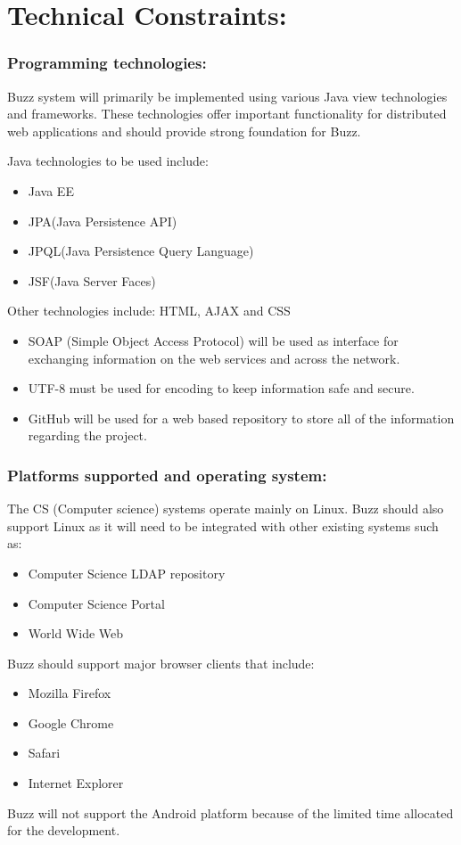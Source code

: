 \documentclass[11pt]{article}
\begin{document}
	\section{Technical Constraints:}
		\subsubsection{	Programming technologies:}
			\textbf{}Buzz system will primarily be implemented using various Java view technologies and frameworks. These technologies offer important functionality for distributed web applications and should provide strong foundation for Buzz.
		
		
	
			\textbf{}Java technologies to be used include:
   	\begin{itemize}		
			\item Java EE
			\item JPA(Java Persistence API)
			\item JPQL(Java  Persistence Query Language)
	 		\item JSF(Java Server Faces)
	\end{itemize}
		\textbf{} Other technologies include: HTML, AJAX and CSS
			\begin{itemize}		
			
		\item 	SOAP (Simple Object Access Protocol) will be used as interface for exchanging information on the web services and across the network.
		\item 	UTF-8 must be used for encoding to keep information safe and secure.
		
		\item 	GitHub will be used for a web based repository to store all of the information regarding the project.
			\end{itemize}
			\subsubsection{Platforms supported and operating system:}
		
			
			\textbf{}The CS (Computer science) systems operate mainly on Linux. Buzz should also support Linux as it will need to be integrated with other existing systems such as:
			\begin{itemize}		
				\item	Computer Science LDAP repository
				\item 	Computer Science Portal
				\item 	World Wide Web
			\end{itemize}
			\textbf{}Buzz should support major browser clients that include:
			\begin{itemize}		
					\item		Mozilla Firefox
					\item		Google Chrome
					\item		Safari
					\item		Internet Explorer
				
			\end{itemize}
			\textbf{}Buzz will not support the Android platform because of the limited time allocated for the development.
\end{document}
